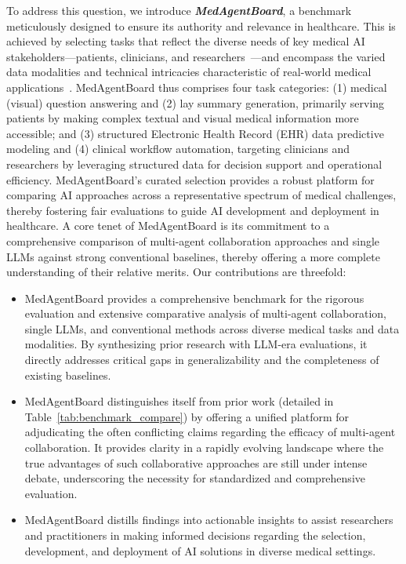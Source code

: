 \documentclass{article}
\begin{document}
To address this question, we introduce \textit{\textbf{MedAgentBoard}}, a benchmark meticulously designed to ensure its authority and relevance in healthcare. This is achieved by selecting tasks that reflect the diverse needs of key medical AI stakeholders—patients, clinicians, and researchers~\cite{shah2019artificial}—and encompass the varied data modalities and technical intricacies characteristic of real-world medical applications~\cite{moor2023foundation}. MedAgentBoard thus comprises four task categories: (1) medical (visual) question answering and (2) lay summary generation, primarily serving patients by making complex textual and visual medical information more accessible; and (3) structured Electronic Health Record (EHR) data predictive modeling and (4) clinical workflow automation, targeting clinicians and researchers by leveraging structured data for decision support and operational efficiency. MedAgentBoard's curated selection provides a robust platform for comparing AI approaches across a representative spectrum of medical challenges, thereby fostering fair evaluations to guide AI development and deployment in healthcare. A core tenet of MedAgentBoard is its commitment to a comprehensive comparison of multi-agent collaboration approaches and single LLMs against strong conventional baselines, thereby offering a more complete understanding of their relative merits. Our contributions are threefold:
\begin{itemize}
    \item MedAgentBoard provides a comprehensive benchmark for the rigorous evaluation and extensive comparative analysis of multi-agent collaboration, single LLMs, and conventional methods across diverse medical tasks and data modalities. By synthesizing prior research with LLM-era evaluations, it directly addresses critical gaps in generalizability and the completeness of existing baselines.
    \item MedAgentBoard distinguishes itself from prior work (detailed in Table~\ref{tab:benchmark_compare}) by offering a unified platform for adjudicating the often conflicting claims regarding the efficacy of multi-agent collaboration. It provides clarity in a rapidly evolving landscape where the true advantages of such collaborative approaches are still under intense debate, underscoring the necessity for standardized and comprehensive evaluation.
    \item MedAgentBoard distills findings into actionable insights to assist researchers and practitioners in making informed decisions regarding the selection, development, and deployment of AI solutions in diverse medical settings.
\end{itemize}
\end{document}
